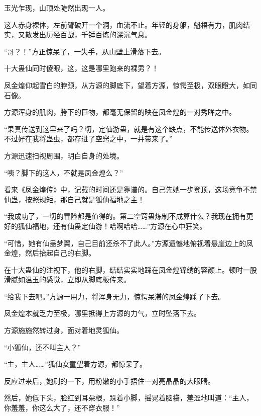 \begin{this_body}
玉光乍现，山顶处陡然出现一人。

这人赤身裸体，左前臂破开一个洞，血流不止。年轻的身躯，魁梧有力，肌肉结实，又散发出历经百战，千锤百炼的深沉气息。

“哥？！”方正惊呆了，一失手，从山壁上滑落下去。

十大蛊仙同时傻眼，这，这是哪里跑来的裸男？！

凤金煌仰起雪白的脖颈，从方源的脚底下，望着方源，惊愕至极，双眼瞪大，如同石像。

方源浑身的肌肉，胯下的巨物，都毫无保留的映在凤金煌的一对秀眸之中。

“果真传送到这里来了吗？切，定仙游蛊，就是有这个缺点，不能传送体外衣物。不过好在我将蛊虫，都存进了空窍之中，一并带来了。”

方源迅速扫视周围，明白自身的处境。

“咦？脚下的这人，不就是凤金煌么？”

看来《凤金煌传》中，记载的时间还是靠谱的。自己先她一步登顶，这场竞争不禁仙蛊，按照规矩，那自己就是狐仙福地之主！

“我成功了，一切的冒险都是值得的。第二空窍蛊炼制不成算什么？我现在拥有更好的狐仙福地，还有仙蛊定仙游！哈啊哈哈……”方源在心中狂笑。

“可惜，她有仙蛊梦翼，自己目前还杀不了此人。”方源遗憾地俯视着悬崖边上的凤金煌，然后抬起自己的右脚。

在十大蛊仙的注视下，他的右脚，结结实实地踩在凤金煌锦绣的容颜上。顿时一股滑腻如温玉的感觉，立即从脚底板传来。

“给我下去吧。”方源一用力，将浑身无力，惊愕呆滞的凤金煌踩了下去。

凤金煌本就乏力至极，哪里抵得上方源的力气，立时坠落下去。

方源施施然转过身，面对着地灵狐仙。

“小狐仙，还不叫主人？”

“主，主人……”狐仙女童望着方源，都惊呆了。

反应过来后，她刷的一下，用粉嫩的小手捂住一对亮晶晶的大眼睛。

然后，她低下头，脸红到耳朵根，跺着小脚，摇晃着脑袋，羞涩地叫道：“主人，你羞羞，你这么大了，还不穿衣服！”

\end{this_body}

